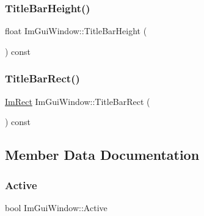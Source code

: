 \hypertarget{struct_im_gui_window_ad1580cc8b5bdf981c6ed2eb22ecd7dbb}{}\label{struct_im_gui_window_ad1580cc8b5bdf981c6ed2eb22ecd7dbb} 
\subsubsection{\texorpdfstring{Title\+Bar\+Height()}{TitleBarHeight()}}
{\footnotesize\ttfamily float Im\+Gui\+Window\+::\+Title\+Bar\+Height (\begin{DoxyParamCaption}{ }\end{DoxyParamCaption}) const}

\hypertarget{struct_im_gui_window_a06884e1bc80e460e51e1626b5b976196}{}\label{struct_im_gui_window_a06884e1bc80e460e51e1626b5b976196} 
\subsubsection{\texorpdfstring{Title\+Bar\+Rect()}{TitleBarRect()}}
{\footnotesize\ttfamily \hyperlink{struct_im_rect}{Im\+Rect} Im\+Gui\+Window\+::\+Title\+Bar\+Rect (\begin{DoxyParamCaption}{ }\end{DoxyParamCaption}) const}



\subsection{Member Data Documentation}
\hypertarget{struct_im_gui_window_a42f141fa0eed059176cb4360df1b1eb2}{}\label{struct_im_gui_window_a42f141fa0eed059176cb4360df1b1eb2} 
\subsubsection{\texorpdfstring{Active}{Active}}
{\footnotesize\ttfamily bool Im\+Gui\+Window\+::\+Active}

\hypertarget{struct_im_gui_window_a158ebb04d20cac09504fdbc4994eb017}{}\label{struct_im_gui_window_a158ebb04d20cac09504fdbc4994eb017} 
